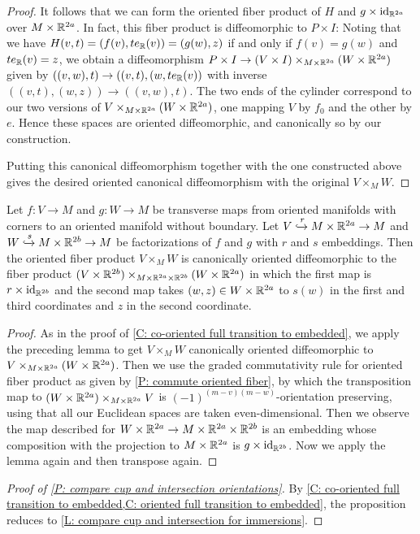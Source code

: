 \begin{proof}
	It follows that we can form the oriented fiber product of $H$ and $g\times\mathrm{id}_{\mathbb{R}^{2a}}$ over $M\times \mathbb{R}^{2a}$.
	In fact, this fiber product is diffeomorphic to $P\times I$: Noting that we have $H(v,t)=(f(v),te_{\mathbb{R}}(v))=(g(w),z)$ if and only if $f(v)=g(w)$ and $te_{\mathbb{R}}(v)=z$, we obtain a diffeomorphism $P\times I\to (V\times I)\times_{M\times \mathbb{R}^{2a}}(W\times \mathbb{R}^{2a})$ given by $((v,w),t)\to ((v,t),(w, te_{\mathbb{R}}(v))$ with inverse $((v,t),(w,z))\to ((v,w),t)$.
	The two ends of the cylinder correspond to our two versions of $V\times_{M\times \mathbb{R}^{2a}} (W\times \mathbb{R}^{2a})$, one mapping $V$ by $f_0$ and the other by $e$.
	Hence these spaces are oriented diffeomorphic, and canonically so by our construction.

	Putting this canonical diffeomorphism together with the one constructed above gives the desired oriented canonical diffeomorphism with the original $V\times_M W$.
\end{proof}

\begin{corollary}\label{C: oriented full transition to embedded}
	Let $f:V\to M$ and $g:W\to M$ be transverse maps from oriented manifolds with corners to an oriented manifold without boundary.
	Let $V\xhookrightarrow{r} M\times \mathbb{R}^{2a}\to M$ and $W\xhookrightarrow{s} M\times \mathbb{R}^{2b}\to M$ be factorizations of $f$ and $g$ with $r$ and $s$ embeddings.
	Then the oriented fiber product $V\times_M W$ is canonically oriented diffeomorphic to the fiber product $(V\times \mathbb{R}^{2b})\times_{M\times \mathbb{R}^{2a}\times \mathbb{R}^{2b}}(W\times \mathbb{R}^{2a})$ in which the first map is $r\times \mathrm{id}_{\mathbb{R}^{2b}}$ and the second map takes $(w,z)\in W\times \mathbb{R}^{2a}$ to $s(w)$ in the first and third coordinates and $z$ in the second coordinate.
\end{corollary}
\begin{proof}
	As in the proof of \cref{C: co-oriented full transition to embedded},
	we apply the preceding lemma to get $V\times_M W$ canonically oriented diffeomorphic to $V\times_{M\times \mathbb{R}^{2a}}(W\times \mathbb{R}^{2a})$.
	Then we use the graded commutativity rule for oriented fiber product as given by \cref{P: commute oriented fiber},
	by which
	the transposition map to $(W\times \mathbb{R}^{2a})\times_{M\times \mathbb{R}^{2a}}V$ is $(-1)^{(m-v)(m-w)}$-orientation preserving, using that all our Euclidean spaces are taken even-dimensional.
	Then we observe the map described for $W\times \mathbb{R}^{2a}\to M\times \mathbb{R}^{2a}\times \mathbb{R}^{2b}$ is an embedding whose composition with the projection to $M\times \mathbb{R}^{2a}$ is $g\times \mathrm{id}_{\mathbb{R}^{2b}}$.
	Now we apply the lemma again and then transpose again.
\end{proof}

\begin{proof}[Proof of \cref{P: compare cup and intersection orientations}]
	By \cref{C: co-oriented full transition to embedded,C: oriented full transition to embedded}, the proposition reduces to \cref{L: compare cup and intersection for immersions}.
\end{proof}

